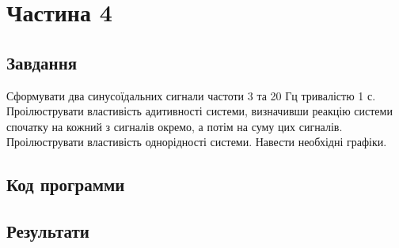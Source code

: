\section{Частина 4}
\label{sec:task4}

\subsection{Завдання}
\label{subsec:task4_task}

Сформувати два синусоїдальних сигнали частоти 3 та 20 Гц
тривалістю 1 с. Проілюструвати властивість адитивності системи,
визначивши реакцію системи спочатку на кожний з сигналів окремо, а потім на
суму цих сигналів. Проілюструвати властивість однорідності системи.
Навести необхідні графіки.

\subsection{Код программи}
\label{subsec:task4_code}

\subsection{Результати}
\label{subsec:task4_results}
